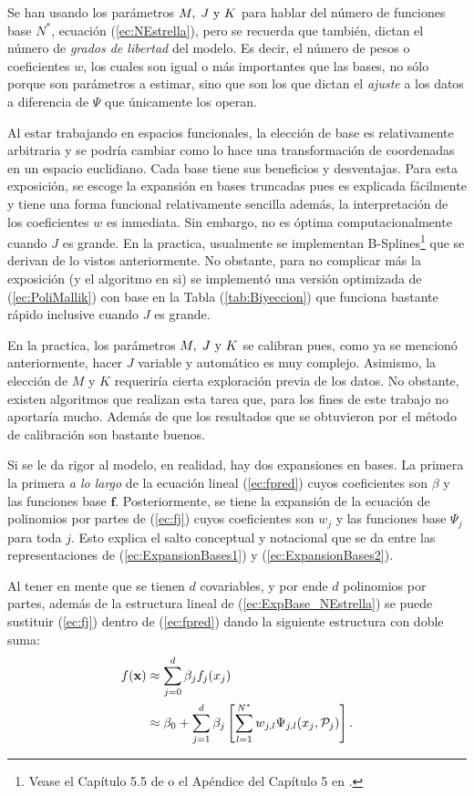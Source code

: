 \documentclass[../Main/Main.tex]{subfiles}
\begin{document}
Se han usando los parámetros $M,\;J\text{ y }K$ para hablar del número de funciones base $N^*$, ecuación (\ref{ec:NEstrella}), pero se recuerda que también, dictan el número de \textit{grados de libertad} del modelo. Es decir, el número de pesos o coeficientes $w$, los cuales son igual o más importantes que las bases, no sólo porque son parámetros a estimar, sino que son los que dictan el \textit{ajuste} a los datos a diferencia de $\Psi$ que únicamente los operan.

Al estar trabajando en espacios funcionales, la elección de base es relativamente arbitraria y se podría cambiar como lo hace una transformación de coordenadas en un espacio euclidiano. Cada base tiene sus beneficios y desventajas. Para esta exposición, se escoge la expansión en bases truncadas pues es explicada fácilmente y tiene una forma funcional relativamente sencilla además, la interpretación de los coeficientes $w$ es inmediata. Sin embargo, no es óptima computacionalmente cuando $J$ es grande. En la practica, usualmente se implementan B-Splines\footnote{Vease el Capítulo 5.5 de \citet{wasserman2007all} o el Apéndice del Capítulo 5 en \citet{hastie2008elements}.} que se derivan de lo vistos anteriormente. No obstante, para no complicar más la exposición (y el algoritmo en si) se implementó una versión optimizada de (\ref{ec:PoliMallik}) con base en la Tabla (\ref{tab:Biyeccion}) que funciona bastante rápido inclusive cuando $J$ es grande.

En la practica, los parámetros $M,\;J\text{ y }K$ se calibran pues, como ya se mencionó anteriormente, hacer $J$ variable y automático es muy complejo. Asimismo, la elección de $M$ y $K$ requeriría cierta exploración previa de los datos. No obstante, existen algoritmos que realizan esta tarea que, para los fines de este trabajo no aportaría mucho. Además de que los resultados que se obtuvieron por el método de calibración son bastante buenos.

Si se le da rigor al modelo, en realidad, hay dos expansiones en bases. La primera la primera \textit{a lo largo} de la ecuación lineal (\ref{ec:fpred}) cuyos coeficientes son $\beta$ y las funciones base $\mathbf{f}$. Posteriormente, se tiene la expansión de la ecuación de polinomios por partes de (\ref{ec:fj}) cuyos coeficientes son $w_j$ y las funciones base $\Psi_j$ para toda $j$. Esto explica el salto conceptual y notacional que se da entre las representaciones de (\ref{ec:ExpansionBases1}) y (\ref{ec:ExpansionBases2}).

Al tener en mente que se tienen $d$ covariables, y por ende $d$ polinomios por partes, además de la estructura lineal de (\ref{ec:ExpBase_NEstrella}) se puede sustituir (\ref{ec:fj}) dentro de (\ref{ec:fpred}) dando la siguiente estructura con doble suma:
\begin{align*}
	f(\mathbf{x}) &\approx \sum_{j=0}^d \beta_j f_j(x_j) \\
			&\approx \beta_0 + \sum_{j=1}^d \beta_j \left[\sum_{l=1}^{N^*} w_{j,l}\Psi_{j,l}(x_j, \mathcal{P}_j)\right].
\end{align*}
\end{document}
